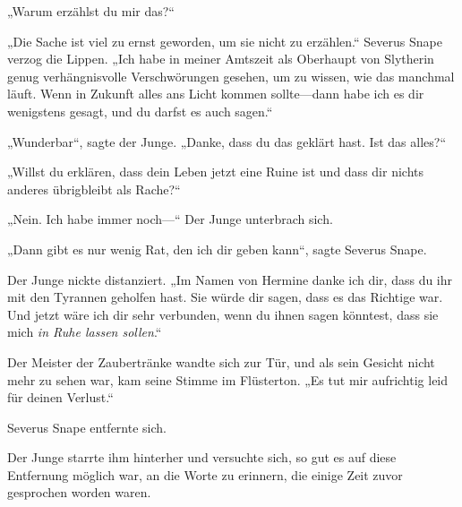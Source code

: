 „Warum erzählst du mir das?“

„Die Sache ist viel zu ernst geworden, um sie nicht zu erzählen.“
Severus Snape verzog die Lippen.
„Ich habe in meiner Amtszeit als Oberhaupt von Slytherin genug verhängnisvolle Verschwörungen gesehen, um zu wissen, wie das manchmal läuft. Wenn in Zukunft alles ans Licht kommen sollte—dann habe ich es dir wenigstens gesagt, und du darfst es auch sagen.“

„Wunderbar“, sagte der Junge. „Danke, dass du das geklärt hast. Ist das alles?“

„Willst du erklären, dass dein Leben jetzt eine Ruine ist und dass dir nichts anderes übrigbleibt als Rache?“

„Nein. Ich habe immer noch—“
Der Junge unterbrach sich.

„Dann gibt es nur wenig Rat, den ich dir geben kann“, sagte Severus Snape.

Der Junge nickte distanziert.
„Im Namen von Hermine danke ich dir, dass du ihr mit den Tyrannen geholfen hast. Sie würde dir sagen, dass es das Richtige war. Und jetzt wäre ich dir sehr verbunden, wenn du ihnen sagen könntest, dass sie mich \emph{in Ruhe lassen sollen}.“

Der Meister der Zaubertränke wandte sich zur Tür, und als sein Gesicht nicht mehr zu sehen war, kam seine Stimme im Flüsterton.
„Es tut mir aufrichtig leid für deinen Verlust.“

Severus Snape entfernte sich.

Der Junge starrte ihm hinterher und versuchte sich, so gut es auf diese Entfernung möglich war, an die Worte zu erinnern, die einige Zeit zuvor gesprochen worden waren.


